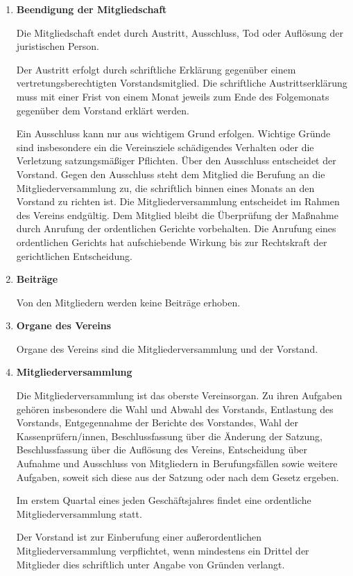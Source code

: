 \documentclass{article}
\begin{document}
\begin{enumerate}[\textsection  1.]
\item \textsf{\textbf{Beendigung der Mitgliedschaft}}

	Die Mitgliedschaft endet durch Austritt, Ausschluss, Tod oder Auflösung der juristischen
	Person.
	
	Der Austritt erfolgt durch schriftliche Erklärung gegenüber einem vertretungsberechtigten
	Vorstandsmitglied. Die schriftliche Austrittserklärung muss mit einer Frist von
	einem Monat jeweils zum Ende des Folgemonats gegenüber dem Vorstand erklärt
	werden.
	
	Ein Ausschluss kann nur aus wichtigem Grund erfolgen. Wichtige Gründe sind insbesondere
	ein die Vereinsziele schädigendes Verhalten oder die Verletzung satzungsmäßiger
	Pflichten. Über den Ausschluss entscheidet der Vorstand. 
	Gegen den Ausschluss steht dem Mitglied die Berufung an die
	Mitgliederversammlung zu, die schriftlich binnen eines Monats an den Vorstand zu
	richten ist. Die Mitgliederversammlung entscheidet im Rahmen des Vereins endgültig.
	Dem Mitglied bleibt die Überprüfung der Maßnahme durch Anrufung der ordentlichen
	Gerichte vorbehalten. Die Anrufung eines ordentlichen Gerichts hat aufschiebende
	Wirkung bis zur Rechtskraft der gerichtlichen Entscheidung.
	
\item \textsf{\textbf{Beiträge}}

	Von den Mitgliedern werden keine Beiträge erhoben. 

\item \textsf{\textbf{Organe des Vereins}}

	Organe des Vereins sind
	die Mitgliederversammlung
	und der Vorstand.
	
\item \textsf{\textbf{Mitgliederversammlung}}

	Die Mitgliederversammlung ist das oberste Vereinsorgan. Zu ihren Aufgaben gehören insbesondere
	die Wahl und Abwahl des Vorstands, Entlastung des Vorstands, Entgegennahme der
	Berichte des Vorstandes, Wahl der Kassenprüfern/innen, Beschlussfassung über die Änderung der Satzung, Beschlussfassung über die Auflösung
	des Vereins, Entscheidung über Aufnahme und Ausschluss von Mitgliedern in Berufungsfällen
	sowie weitere Aufgaben, soweit sich diese aus der Satzung oder nach dem Gesetz
	ergeben.

	Im erstem Quartal eines jeden Geschäftsjahres findet eine ordentliche Mitgliederversammlung
	statt.

	Der Vorstand ist zur Einberufung einer außerordentlichen Mitgliederversammlung
	verpflichtet, wenn mindestens ein Drittel der Mitglieder dies schriftlich unter Angabe
	von Gründen verlangt.
	

\end{enumerate}
\end{document}
